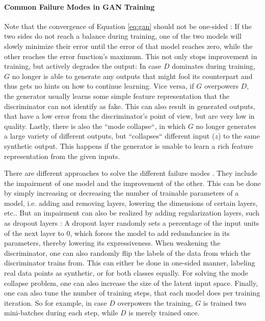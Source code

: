 \paragraph{Common Failure Modes in GAN Training} \label{par:failure_modes}
Note that the convergence of Equation \ref{eq:gan} should not be one-sided \cite{zhang2018convergence}: If the two sides do not reach a balance during training, one of the two models will slowly minimize their error until the error of that model reaches zero, while the other reaches the error function's maximum. This not only stops improvement in training, but actively degrades the output: In case $D$ dominates during training, $G$ no longer is able to generate any outputs that might fool its counterpart and thus gets no hints on how to continue learning. Vice versa, if $G$ overpowers $D$, the generator usually learns some simple feature representation that the discriminator can not identify as fake. This can also result in generated outputs, that have a low error from the discriminator's point of view, but are very low in quality. Lastly, there is also the ``mode collapse``, in which $G$ no longer generates a large variety of different outputs, but ``collapses`` different input ($z$) to the same synthetic output. This happens if the generator is unable to learn a rich feature representation from the given inputs.

There are different approaches to solve the different failure modes \cite{roth2017stabilizing, zhang2018convergence}. They include the impairment of one model and the improvement of the other. This can be done by simply increasing or decreasing the number of trainable parameters of a model, i.e. adding and removing layers, lowering the dimensions of certain layers, etc.. But an impairment can also be realized by adding regularization layers, such as dropout layers \cite{hinton2012improving}: A dropout layer randomly sets a percentage of the input units of the next layer to 0, which forces the model to add redundancies in its parameters, thereby lowering its expressiveness. When weakening the discriminator, one can also randomly flip the labels of the data from which the discriminator trains from. This can either be done in one-sided manner, labeling real data points as synthetic, or for both classes equally. For solving the mode collapse problem, one can also increase the size of the latent input space. Finally, one can also tune the number of training steps, that each model does per training iteration. So for example, in case $D$ overpowers the training, $G$ is trained two mini-batches during each step, while $D$ is merely trained once.

